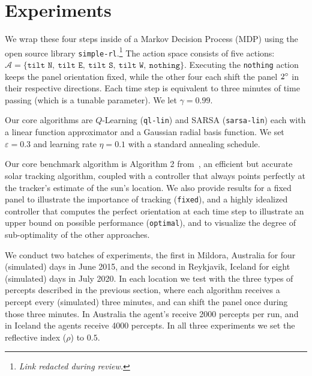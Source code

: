 \documentclass{article}
\newcommand{\mc}{\mathcal}
\begin{document}
{%
\section{Experiments}


We wrap these four steps inside of a Markov Decision Process (MDP) using the open source library \texttt{simple-rl}.\footnote{{\it Link redacted during review.}} The action space consists of five actions: $\mc{A} = \{\texttt{tilt N},\ \texttt{tilt E},\ \texttt{tilt S},\ \texttt{tilt W},\ \texttt{nothing}\}$. Executing the \texttt{nothing} action keeps the panel orientation fixed, while the other four each shift the panel $2\degree$ in their respective directions. Each time step is equivalent to three minutes of time passing (which is a tunable parameter). We let $\gamma=0.99$.

Our core algorithms are $Q$-Learning (\texttt{ql-lin}) and SARSA (\texttt{sarsa-lin}) each with a linear function approximator and a Gaussian radial basis function. We set $\varepsilon=0.3$ and learning rate $\eta = 0.1$ with a standard annealing schedule. 

Our core benchmark algorithm is Algorithm 2 from~\citet{Grena2012}, an efficient but accurate solar tracking algorithm, coupled with a controller that always points perfectly at the tracker's estimate of the sun's location. We also provide results for a fixed panel to illustrate the importance of tracking (\texttt{fixed}), and a highly idealized controller that computes the perfect orientation at each time step to illustrate an upper bound on possible performance (\texttt{optimal}), and to visualize the degree of sub-optimality of the other approaches.


We conduct two batches of experiments, the first in Mildora, Australia for four (simulated) days in June 2015, and the second in Reykjavik, Iceland for eight (simulated) days in July 2020. In each location we test with the three types of percepts described in the previous section, where each algorithm receives a percept every (simulated) three minutes, and can shift the panel once during those three minutes. In Australia the agent's receive 2000 percepts per run, and in Iceland the agents receive 4000 percepts. In all three experiments we set the reflective index ($\rho$) to $0.5$.

}
\end{document}
